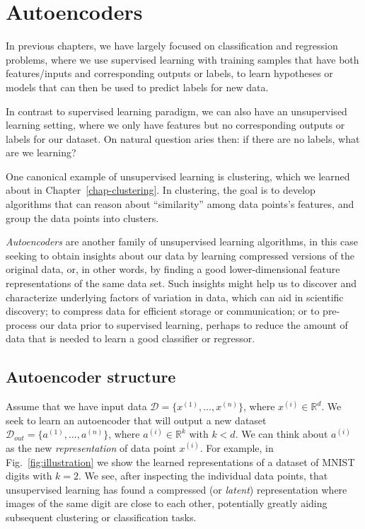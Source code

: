 \chapter{Autoencoders}
\label{chap-autoencoders}

In previous chapters, we have largely focused on classification and
regression problems, where we use supervised learning with training
samples that have both features/inputs and corresponding outputs or labels, to
learn hypotheses or models that can then be used to predict labels for
new data.

In contrast to supervised learning paradigm, we can also have an unsupervised learning setting, where we only have features but no
corresponding outputs or labels for our dataset. On natural question aries then: if there are no labels, what are we learning?


One canonical example of unsupervised learning is clustering,
which we learned about in Chapter~\ref{chap-clustering}.
In clustering, the goal is to develop algorithms that can reason about
``similarity'' among data points's features, and group the data points
into clusters.

  {\em Autoencoders} are another family of unsupervised learning
algorithms, in this case seeking to obtain insights about our data by
learning compressed versions of the original data, or, in other words,
by finding a good lower-dimensional feature representations of the
same data set. Such insights might help us to discover and
characterize underlying factors of variation in data, which can aid in
scientific discovery; to compress data for efficient storage or
communication; or to pre-process our data prior to supervised
learning, perhaps to reduce the amount of data that is needed to learn
a good classifier or regressor.

\section{Autoencoder structure}

Assume that we have input data $\mathcal{D} = \{x^{(1)}, \ldots,
  x^{(n)} \}$, where $x^{(i)}\in \mathbb{R}^d$. We seek to learn an
autoencoder that will output a new dataset $\mathcal{D}_{out} =
  \{a^{(1)}, \ldots, a^{(n)}\}$, where $a^{(i)}\in \mathbb{R}^k$ with $k
  < d$. We can think about $a^{(i)}$ as the new \textit{representation}
of data point $x^{(i)}$. For example, in Fig.~\ref{fig:illustration}
we show the learned representations of a dataset of MNIST digits with
$k=2$. We see, after inspecting the individual data points, that
unsupervised learning has found a compressed (or {\em latent})
representation where images of the same digit are close to each
other, potentially greatly aiding subsequent clustering or
classification tasks.

